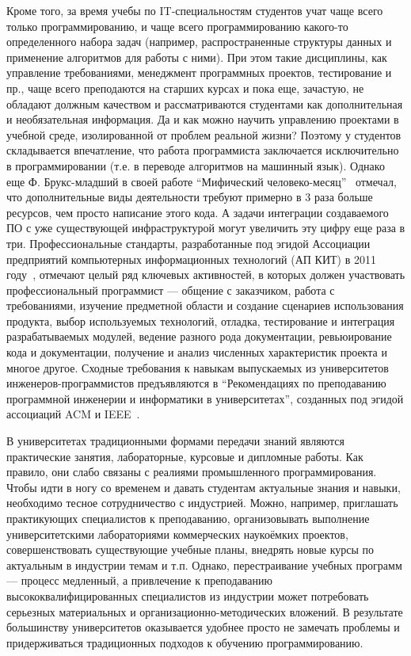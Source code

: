 \documentclass[a4paper]{article}
\begin{document}
Кроме того, за время учебы по IT-специальностям студентов учат чаще всего только программированию, и чаще всего программированию  какого-то определенного набора задач (например, распространенные структуры данных и применение алгоритмов для работы с ними). При этом такие дисциплины, как управление требованиями, менеджмент программных проектов, тестирование и пр., чаще всего преподаются на старших курсах и пока еще, зачастую, не обладают должным качеством и рассматриваются студентами как дополнительная и необязательная информация. Да и как можно научить управлению проектами в учебной среде, изолированной от проблем реальной жизни? Поэтому у студентов складывается впечатление, что работа программиста заключается исключительно в программировании  (т.е. в переводе алгоритмов на машинный язык). Однако еще Ф. Брукс-младший в своей работе ``Мифический человеко-месяц''~\cite{brooks} отмечал, что дополнительные виды деятельности требуют примерно в 3 раза больше ресурсов, чем просто написание этого кода. А задачи интеграции создаваемого ПО с уже существующей инфраструктурой могут увеличить эту цифру еще раза в три. Профессиональные стандарты, разработанные под эгидой Ассоциации предприятий компьютерных информационных технологий (АП КИТ) в 2011 году~\cite{apkit},  отмечают целый ряд ключевых активностей, в которых должен участвовать профессиональный программист --- общение с заказчиком, работа с требованиями, изучение предметной области и создание сценариев использования продукта, выбор используемых технологий, отладка, тестирование и интеграция разрабатываемых модулей, ведение разного рода документации, ревьюирование кода и документации, получение и анализ численных характеристик проекта и многое другое. Сходные требования к навыкам  выпускаемых из университетов инженеров-программистов предъявляются в ``Рекомендациях по преподаванию программной инженерии и информатики в университетах'', созданных под эгидой ассоциаций ACM и  IEEE~\cite{curriculum, terekhov2}. 

В университетах традиционными формами передачи знаний  являются практические занятия, лабораторные, курсовые и дипломные работы. Как правило, они слабо связаны с реалиями промышленного программирования. Чтобы идти в ногу со временем и давать студентам актуальные знания и навыки, необходимо тесное сотрудничество с индустрией. Можно, например, приглашать практикующих специалистов к преподаванию, организовывать выполнение университетскими лабораториями коммерческих наукоёмких  проектов, совершенствовать существующие учебные планы, внедрять новые курсы по актуальным в индустрии темам и  т.п. Однако, перестраивание учебных программ --- процесс медленный, а привлечение к преподаванию высококвалифицированных специалистов из индустрии может потребовать серьезных материальных и организационно-методических вложений. В результате большинству университетов оказывается удобнее просто не замечать проблемы и придерживаться традиционных подходов к обучению программированию.
\end{document}
